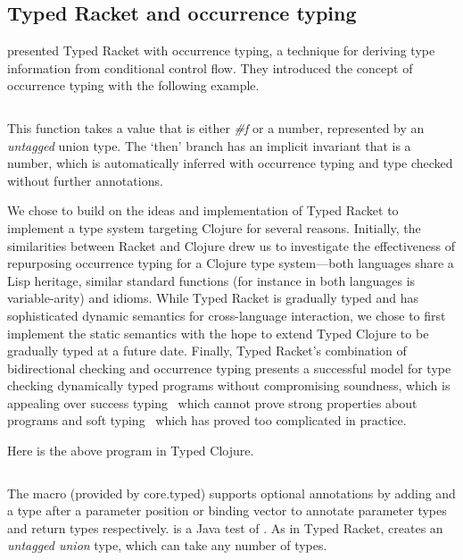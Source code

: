 \subsection{Typed Racket and occurrence typing}

\citet{TF10}
presented Typed Racket with occurrence typing,
a technique for deriving type information from conditional control flow.
They introduced the concept of occurrence typing 
with the following example.

\inputminted[firstline=3]{racket}{code/tr/example1.rkt}

This function takes a value that is either \emph{\#f} %
or a number, represented by an \emph{untagged} union type.
The `then' branch has an implicit invariant
that  is a number, which is automatically inferred with occurrence typing
and type checked without further annotations.

We chose to build on the ideas and implementation
of Typed Racket to implement a type system targeting Clojure for several reasons.
Initially, the similarities between Racket and Clojure drew us to
investigate the effectiveness of repurposing occurrence typing
for a Clojure type system---both languages share a Lisp heritage,
similar standard functions 
(for instance 
in both languages is variable-arity)
and idioms.
While Typed Racket is gradually typed and has sophisticated
dynamic semantics for cross-language interaction, we 
chose to first implement
the static semantics
with the hope to extend Typed Clojure to be gradually typed at a future date.
Finally,
Typed Racket's combination of bidirectional checking
and occurrence typing presents a successful model for 
type checking dynamically typed programs without compromising
soundness, which is appealing over success typing~\cite{Lindahl:2006:PTI}
which cannot prove strong properties about programs
and soft typing~\cite{CF91}
which has proved too complicated in practice.

Here is the above program in Typed Clojure.
\begin{exmp}
\inputminted[firstline=5]{clojure}{code/demo/src/demo/eg1.clj}
\label{example:conditionalflow}
\end{exmp}

The  macro (provided by core.typed) supports optional annotations by 
adding
\clj{:-} and a type after a parameter
position
or binding vector 
to annotate parameter types
and return types respectively.
 is
a Java  test of .
As in Typed Racket,  creates an \emph{untagged union} type, which can take
any number of types.

